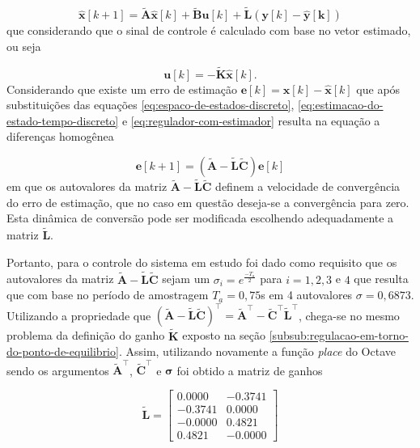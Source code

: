 \begin{equation}
    \label{eq:estimacao-do-estado-tempo-discreto}
    \mathbf{\hat{x}}[k+1] = \mathbf{\tilde{A}}\mathbf{\hat{x}}[k]
                            + \mathbf{\tilde{B}}\mathbf{u}[k]
                            + \mathbf{\tilde{L}}(\mathbf{y}[k] - \mathbf{\hat{y}[k]})
\end{equation} que considerando que o sinal de controle é calculado com base no
vetor estimado, ou seja

\begin{equation}
    \label{eq:acao-de-conrole-com-estimador}
    \mathbf{u}[k] = -\mathbf{\tilde{K}}\mathbf{\hat{x}}[k]\text{.}
\end{equation} Considerando que existe um erro de estimação
$\mathbf{e}[k] = \mathbf{x}[k] - \mathbf{\hat{x}}[k]$ que após substituições das
equações \ref{eq:espaco-de-estados-discreto},
\ref{eq:estimacao-do-estado-tempo-discreto} e \ref{eq:regulador-com-estimador}
resulta na equação a diferenças homogênea

\begin{equation}
    \label{eq:erro-de-estimacao}
    \mathbf{e}[k+1] = (\mathbf{\tilde{A}}-\mathbf{\tilde{L}}\mathbf{\tilde{C}})\mathbf{e}[k]
\end{equation} em que os autovalores da matriz
$\mathbf{\tilde{A}}-\mathbf{\tilde{L}}\mathbf{\tilde{C}}$ definem a velocidade
de convergência do erro de estimação, que no caso em questão deseja-se a
convergência para zero. Esta dinâmica de conversão pode ser modificada
escolhendo adequadamente a matriz $\mathbf{\tilde{L}}$.

Portanto, para o controle do sistema em estudo foi dado como requisito que os
autovalores da matriz $\mathbf{\tilde{A}}-\mathbf{\tilde{L}}\mathbf{\tilde{C}}$
sejam um $\sigma_i = e^{\frac{-T_a}{2}}$ para $i = 1, 2, 3$ e $4$ que resulta
que com base no período de amostragem $T_a = 0,75$s em 4 autovalores $\sigma =
0,6873$. Utilizando a propriedade que
$(\mathbf{\tilde{A}}-\mathbf{\tilde{L}}\mathbf{\tilde{C}})^\top =
\mathbf{\tilde{A}}^\top - \mathbf{\tilde{C}}^\top\mathbf{\tilde{L}}^\top$,
chega-se no mesmo problema da definição do ganho $\mathbf{\tilde{K}}$ exposto na
seção \ref{subsub:regulacao-em-torno-do-ponto-de-equilibrio}. Assim, utilizando
novamente a função \textit{place} do Octave sendo os argumentos
$\mathbf{\tilde{A}}^\top$, $\mathbf{\tilde{C}}^\top$ e $\mathbf{\sigma}$ foi
obtido a matriz de ganhos

\begin{equation}
    \label{eq:matriz-de-ganhos-do-estimador}
    \mathbf{\tilde{L}} =
    \begin{bmatrix}
        0.0000  & -0.3741   \\
        -0.3741 & 0.0000    \\
        -0.0000 & 0.4821    \\
        0.4821  & -0.0000
    \end{bmatrix}
\end{equation}

